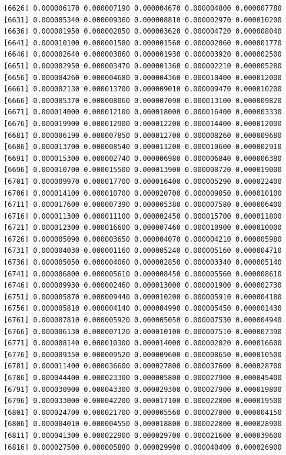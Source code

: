 \documentclass[]{article}
\begin{document}
\begin{verbatim}
 [6626] 0.000006170 0.000007190 0.000004670 0.000004800 0.000007780
 [6631] 0.000005340 0.000009360 0.000008810 0.000002970 0.000010200
 [6636] 0.000001950 0.000002850 0.000003620 0.000004720 0.000008040
 [6641] 0.000010100 0.000001580 0.000001560 0.000002060 0.000001770
 [6646] 0.000002640 0.000003860 0.000001930 0.000003920 0.000002500
 [6651] 0.000002950 0.000003470 0.000001360 0.000002210 0.000005280
 [6656] 0.000004260 0.000004680 0.000004360 0.000010400 0.000012000
 [6661] 0.000002130 0.000013700 0.000009010 0.000009470 0.000010200
 [6666] 0.000005370 0.000008060 0.000007090 0.000013100 0.000009820
 [6671] 0.000014000 0.000012100 0.000018000 0.000016400 0.000003330
 [6676] 0.000019900 0.000012900 0.000012200 0.000014400 0.000012000
 [6681] 0.000006190 0.000007850 0.000012700 0.000008260 0.000009680
 [6686] 0.000013700 0.000008540 0.000011200 0.000010600 0.000002910
 [6691] 0.000015300 0.000002740 0.000006980 0.000006840 0.000006380
 [6696] 0.000010700 0.000015500 0.000013900 0.000008720 0.000019000
 [6701] 0.000009970 0.000017700 0.000016400 0.000005290 0.000022400
 [6706] 0.000014100 0.000010700 0.000020700 0.000009050 0.000010100
 [6711] 0.000017600 0.000007390 0.000005380 0.000007580 0.000006400
 [6716] 0.000011300 0.000011100 0.000002450 0.000015700 0.000011800
 [6721] 0.000012300 0.000016600 0.000007460 0.000010900 0.000010000
 [6726] 0.000005090 0.000003650 0.000004070 0.000004210 0.000005980
 [6731] 0.000004030 0.000001160 0.000005240 0.000005160 0.000004710
 [6736] 0.000005050 0.000004060 0.000002850 0.000003340 0.000005140
 [6741] 0.000006800 0.000005610 0.000008450 0.000005560 0.000008610
 [6746] 0.000009930 0.000002460 0.000013000 0.000001900 0.000002730
 [6751] 0.000005870 0.000009440 0.000010200 0.000005910 0.000004180
 [6756] 0.000005810 0.000004140 0.000004990 0.000005450 0.000001430
 [6761] 0.000007810 0.000005920 0.000005050 0.000007530 0.000004940
 [6766] 0.000006130 0.000007120 0.000010100 0.000007510 0.000007390
 [6771] 0.000008140 0.000010300 0.000014000 0.000002020 0.000016600
 [6776] 0.000009350 0.000009520 0.000009600 0.000008650 0.000010500
 [6781] 0.000011400 0.000036600 0.000027800 0.000037600 0.000028700
 [6786] 0.000044400 0.000023300 0.000005800 0.000027900 0.000045400
 [6791] 0.000030900 0.000043300 0.000029300 0.000027900 0.000019800
 [6796] 0.000033000 0.000042200 0.000017100 0.000022800 0.000019500
 [6801] 0.000024700 0.000021700 0.000005560 0.000027000 0.000004150
 [6806] 0.000004010 0.000004550 0.000018800 0.000022800 0.000028900
 [6811] 0.000041300 0.000022900 0.000029700 0.000021600 0.000039600
 [6816] 0.000027500 0.000005880 0.000029900 0.000040400 0.000026900

\end{verbatim}
\end{document}
